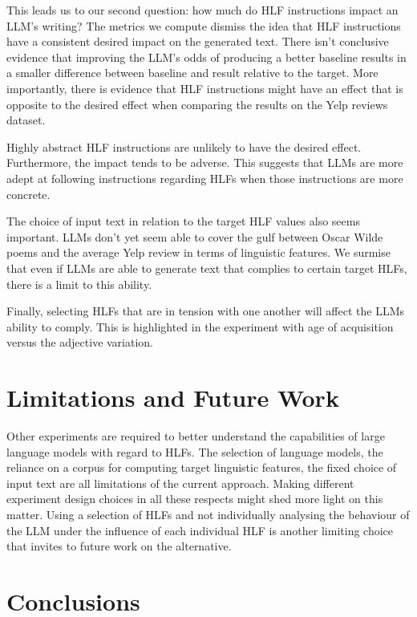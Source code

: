 \documentclass[11pt]{article}
\begin{document}
This leads us to our second question: how much do HLF instructions impact an
LLM's writing?
The metrics we compute dismiss the idea that HLF instructions have a consistent
desired impact on the generated text.
There isn't conclusive evidence that improving the LLM's odds of producing a
better baseline results in a smaller difference between baseline and result
relative to the target.
More importantly, there is evidence that HLF instructions might have an effect
that is opposite to the desired effect when comparing the results on the Yelp
reviews dataset.

Highly abstract HLF instructions are unlikely to have the desired effect.
Furthermore, the impact tends to be adverse.
This suggests that LLMs are more adept at following instructions regarding HLFs
when those instructions are more concrete.

The choice of input text in relation to the target HLF values also seems
important.
LLMs don't yet seem able to cover the gulf between Oscar Wilde poems and the
average Yelp review in terms of linguistic features.
We surmise that even if LLMs are able to generate text that complies to certain
target HLFs, there is a limit to this ability.

Finally, selecting HLFs that are in tension with one another will affect the
LLMs ability to comply.
This is highlighted in the experiment with age of acquisition versus the
adjective variation.

\section{Limitations and Future Work}

Other experiments are required to better understand the capabilities of large
language models with regard to HLFs.
The selection of language models, the reliance on a corpus for computing target
linguistic features, the fixed choice of input text are all limitations of the
current approach.
Making different experiment design choices in all these respects might shed more
light on this matter.
Using a selection of HLFs and not individually analysing the behaviour of the
LLM under the influence of each individual HLF is another limiting choice that
invites to future work on the alternative.

\section{Conclusions}
\end{document}
